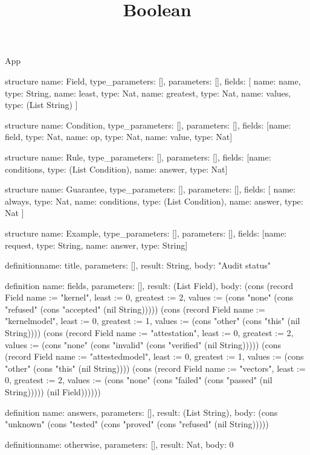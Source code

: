 \begin{lexlean}{App}
\title{Boolean}
\begin{semanticmodule}
structure{
  name: Field,
  type_parameters: [],
  parameters: [],
  fields: [
    {name: name, type: String},
    {name: least, type: Nat},
    {name: greatest, type: Nat},
    {name: values, type: (List String)}
  ]
}

structure{
  name: Condition,
  type_parameters: [],
  parameters: [],
  fields: [{name: field, type: Nat}, {name: op, type: Nat}, {name: value, type: Nat}]
}

structure{
  name: Rule,
  type_parameters: [],
  parameters: [],
  fields: [{name: conditions, type: (List Condition)}, {name: answer, type: Nat}]
}

structure{
  name: Guarantee,
  type_parameters: [],
  parameters: [],
  fields: [
    {name: always, type: Nat},
    {name: conditions, type: (List Condition)},
    {name: answer, type: Nat}
  ]
}

structure{
  name: Example,
  type_parameters: [],
  parameters: [],
  fields: [{name: request, type: String}, {name: answer, type: String}]
}

definition{name: title, parameters: [], result: String, body: "Audit status"}

definition{
  name: fields,
  parameters: [],
  result: (List Field),
  body: (cons (record Field {name := "kernel", least := 0, greatest := 2, values := (cons "none" (cons "refused" (cons "accepted" (nil String))))}) (cons (record Field {name := "kernelmodel", least := 0, greatest := 1, values := (cons "other" (cons "this" (nil String)))}) (cons (record Field {name := "attestation", least := 0, greatest := 2, values := (cons "none" (cons "invalid" (cons "verified" (nil String))))}) (cons (record Field {name := "attestedmodel", least := 0, greatest := 1, values := (cons "other" (cons "this" (nil String)))}) (cons (record Field {name := "vectors", least := 0, greatest := 2, values := (cons "none" (cons "failed" (cons "passed" (nil String))))}) (nil Field))))))
}

definition{
  name: answers,
  parameters: [],
  result: (List String),
  body: (cons "unknown" (cons "tested" (cons "proved" (cons "refused" (nil String)))))
}

definition{name: otherwise, parameters: [], result: Nat, body: 0}


\end{semanticmodule}
\end{lexlean}
